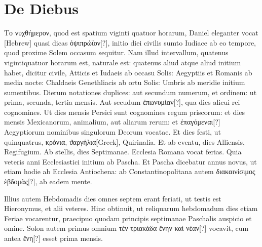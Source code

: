 \section{De Diebus}
\textgreek{Το νυχθήμερον},
quod est spatium viginti quatuor horarum, Daniel
eleganter vocat \texthebrew{}[Hebrew] quasi dicas
 \textgreek{ὀψιπρώϊον[?]}, initio diei civilis
sumto Iudiace ab eo tempore, quod proxime Solem occasum
sequitur.
Nam illud intervallum, quatenus vigintiquatuor horarum est,
naturale est: quatenus aliud atque aliud initium habet, dicitur civile,
Atticis et Iudaeis ab occasu Solis: Aegyptiis et Romanis ab media nocte:
Chaldaeis Genethliacis ab ortu Solis: Umbris ab meridie initium
sumentibus.
Dierum notationes duplices: aut secundum numerum, et
ordinem: ut prima, secunda, tertia mensis.
Aut secudum \textgreek{ἐπωνυμίαν[?]},
qua dies alicui rei cognomines.
Ut dies mensis Persici sunt cognomines
regum priscorum: et dies mensis Mexicanorum, animalium, aut aliarum
rerum: et \textgreek{ἐπαγόμεναι[?]} Aegyptiorum nominibus singulorum Deorum
vocatae.
Et dies festi, ut quinquatrus, \textgreek{κρόνια},
\textgreek{ϑαργήλια[Greek]}, Quirinalia.
Et ab eventu, dies Alliensis, Regifugium.
Ab stellis, dies Septimanae.
Ecclesia Romana vocat ferias.
Quia veteris anni Ecclesiastici initium
ab Pascha.
Et Pascha dicebatur annus novus, ut etiam hodie ab Ecclesia
Antiochena: ab Constantinopolitana autem \textgreek{διακαινίσιμος ἑβδομὰς[?]},
ab eadem mente.
\begin{table}[tbp]
  
\end{table}
Illius autem Hebdomadis dies omnes septem erant
feriati, ut testis est Hieronymus, et alii veteres.
Hinc obtinuit, ut reliquarum
hebdomadum dies etiam Feriae vocarentur, praecipuo quodam
principis septimanae Paschalis auspicio et omine.
Solon autem
primus omnium \textgreek{τὲν τριακάδα ἔνην καὶ νέαν[?]} vocavit,
 cum antea \textgreek{ἔνη[?]} esset
prima mensis.
